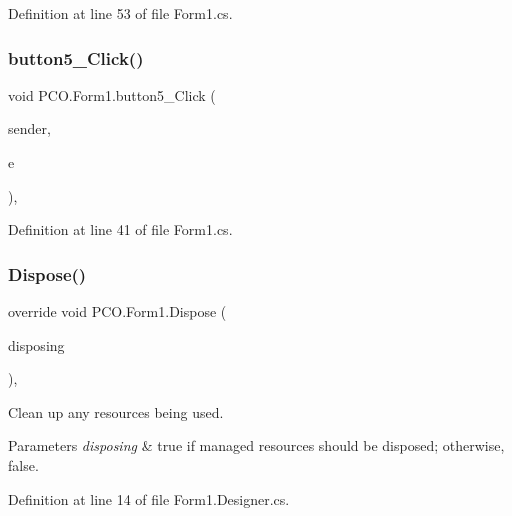 Definition at line 53 of file Form1.\+cs.

\mbox{\label{classPCO_1_1Form1_a07b1eafede464b3c6a585cd278e18e3f}} 
\subsubsection{\texorpdfstring{button5\+\_\+\+Click()}{button5\_Click()}}
{\footnotesize\ttfamily void P\+C\+O.\+Form1.\+button5\+\_\+\+Click (\begin{DoxyParamCaption}\item[{object}]{sender,  }\item[{Event\+Args}]{e }\end{DoxyParamCaption})\hspace{0.3cm}{\ttfamily [inline]}, {\ttfamily [private]}}



Definition at line 41 of file Form1.\+cs.

\mbox{\label{classPCO_1_1Form1_a343effb0ec2c196680a62cedb8eae378}} 
\subsubsection{\texorpdfstring{Dispose()}{Dispose()}}
{\footnotesize\ttfamily override void P\+C\+O.\+Form1.\+Dispose (\begin{DoxyParamCaption}\item[{bool}]{disposing }\end{DoxyParamCaption})\hspace{0.3cm}{\ttfamily [inline]}, {\ttfamily [protected]}}



Clean up any resources being used. 


\begin{DoxyParams}{Parameters}
{\em disposing} & true if managed resources should be disposed; otherwise, false.\\
\hline
\end{DoxyParams}


Definition at line 14 of file Form1.\+Designer.\+cs.

